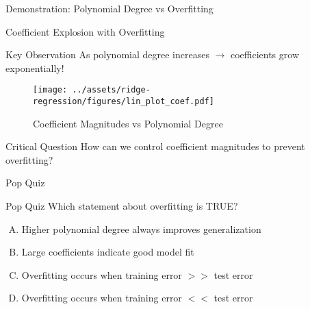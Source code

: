 \documentclass{beamer}
\begin{document}
\begin{frame}{Demonstration: Polynomial Degree vs Overfitting}
\vspace{0.4cm}
\end{frame}  

\begin{frame}{Coefficient Explosion with Overfitting}
\vspace{0.4cm}
\begin{keypointsbox}{Key Observation}
As polynomial degree increases $\rightarrow$ coefficients grow exponentially!
\end{keypointsbox}
\vspace{0.2cm}
\begin{figure}\texttt{[image: ../assets/ridge-regression/figures/lin\_plot\_coef.pdf]}\caption{Coefficient Magnitudes vs Polynomial Degree}\end{figure}

\begin{alertbox}{Critical Question}
How can we control coefficient magnitudes to prevent overfitting?
\end{alertbox}
\end{frame}

\begin{frame}{Pop Quiz \thepopquiz}
\begin{popquizbox}{Pop Quiz \thepopquiz}
Which statement about overfitting is TRUE?
\begin{enumerate}[A)]
\item Higher polynomial degree always improves generalization
\item Large coefficients indicate good model fit
\item Overfitting occurs when training error $>>$ test error
\item Overfitting occurs when training error $<<$ test error
\end{enumerate}
\end{popquizbox}
\end{frame}
\end{document}
